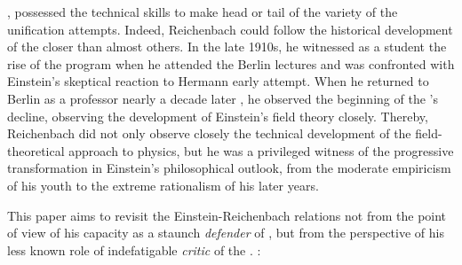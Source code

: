 \documentclass[draft]{article}
\newcommand{\FP}{\german{Fernparallelismus}\xspace}
\begin{document}
%


, possessed the technical skills to make head or tail of the variety of the unification attempts. Indeed, Reichenbach could follow the historical development of the \uftp closer than almost others. In the late 1910s, he witnessed as a student the rise of the program when he attended the Berlin lectures and was confronted with Einstein's skeptical reaction to Hermann  early attempt. When he returned to Berlin as a professor nearly a decade later , he observed the beginning of the \uftp's decline, observing the development of Einstein's \FP field theory closely. Thereby, Reichenbach did not only observe closely the technical development of the field-theoretical approach to physics, but he was a privileged witness of the progressive transformation in Einstein's philosophical outlook, from the moderate empiricism of his youth to the extreme rationalism of his later years.


This paper aims to revisit the Einstein-Reichenbach relations not from the point of view of his capacity as a staunch \emph{defender} of \rt \cite{Hentschel1982}, but from the perspective of his less known role of indefatigable \emph{critic} of the \uftp. :
\end{document}
